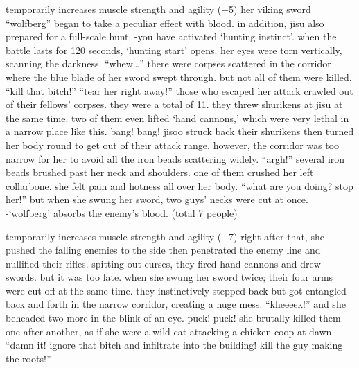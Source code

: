 temporarily increases muscle strength and agility (+5) her viking sword “wolfberg” began to take a peculiar effect with blood.
 in addition, jisu also prepared for a full-scale hunt.
 -you have activated ‘hunting instinct’.
when the battle lasts for 120 seconds, ‘hunting start’ opens.
 her eyes were torn vertically, scanning the darkness.
 “whew…” there were corpses scattered in the corridor where the blue blade of her sword swept through.
 but not all of them were killed.
 “kill that bitch!” “tear her right away!” those who escaped her attack crawled out of their fellows’ corpses.
 they were a total of 11.
 they threw shurikens at jisu at the same time.
 two of them even lifted ‘hand cannons,’ which were very lethal in a narrow place like this.
 bang! bang! jisoo struck back their shurikens then turned her body round to get out of their attack range.
 however, the corridor was too narrow for her to avoid all the iron beads scattering widely.
 “argh!” several iron beads brushed past her neck and shoulders.
 one of them crushed her left collarbone.
 she felt pain and hotness all over her body.
 “what are you doing? stop her!” but when she swung her sword, two guys’ necks were cut at once.
 -‘wolfberg’ absorbs the enemy’s blood.
 (total 7 people)

temporarily increases muscle strength and agility (+7) right after that, she pushed the falling enemies to the side then penetrated the enemy line and nullified their rifles.
 spitting out curses, they fired hand cannons and drew swords.
 but it was too late.
 when she swung her sword twice; their four arms were cut off at the same time.
 they instinctively stepped back but got entangled back and forth in the narrow corridor, creating a huge mess.
 “kheeeek!” and she beheaded two more in the blink of an eye.
 puck! puck! she brutally killed them one after another, as if she were a wild cat attacking a chicken coop at dawn.
 “damn it! ignore that bitch and infiltrate into the building! kill the guy making the roots!”

 
